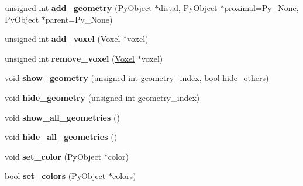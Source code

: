 \begin{DoxyCompactItemize}
\item 
\hypertarget{classCompartment_aab05340ee74143998ff715fcd8ff2f0c}{unsigned int {\bfseries add\-\_\-geometry} (Py\-Object $\ast$distal, Py\-Object $\ast$proximal=Py\-\_\-\-None, Py\-Object $\ast$parent=Py\-\_\-\-None)}\label{classCompartment_aab05340ee74143998ff715fcd8ff2f0c}

\item 
\hypertarget{classCompartment_acf7782fd4a6c881ba22b0496aadbfcb7}{unsigned int {\bfseries add\-\_\-voxel} (\hyperlink{classVoxel}{Voxel} $\ast$voxel)}\label{classCompartment_acf7782fd4a6c881ba22b0496aadbfcb7}

\item 
\hypertarget{classCompartment_aa59eec53596025959d8da75000d55608}{unsigned int {\bfseries remove\-\_\-voxel} (\hyperlink{classVoxel}{Voxel} $\ast$voxel)}\label{classCompartment_aa59eec53596025959d8da75000d55608}

\item 
\hypertarget{classCompartment_ad85eb22510c7f0518d0f0a12ff361ca7}{void {\bfseries show\-\_\-geometry} (unsigned int geometry\-\_\-index, bool hide\-\_\-others)}\label{classCompartment_ad85eb22510c7f0518d0f0a12ff361ca7}

\item 
\hypertarget{classCompartment_a36304c9171a1b6fbf0652379b67fce67}{void {\bfseries hide\-\_\-geometry} (unsigned int geometry\-\_\-index)}\label{classCompartment_a36304c9171a1b6fbf0652379b67fce67}

\item 
\hypertarget{classCompartment_a0ea1d6d34e1e5b5498659ccf51c413d2}{void {\bfseries show\-\_\-all\-\_\-geometries} ()}\label{classCompartment_a0ea1d6d34e1e5b5498659ccf51c413d2}

\item 
\hypertarget{classCompartment_ae5d31347af38773bef049bc995b6900d}{void {\bfseries hide\-\_\-all\-\_\-geometries} ()}\label{classCompartment_ae5d31347af38773bef049bc995b6900d}

\item 
\hypertarget{classCompartment_a88709d6915c189fc6d31de59309648c8}{void {\bfseries set\-\_\-color} (Py\-Object $\ast$color)}\label{classCompartment_a88709d6915c189fc6d31de59309648c8}

\item 
\hypertarget{classCompartment_a6f7c863df4f6975c3d5706b732b99ea4}{bool {\bfseries set\-\_\-colors} (Py\-Object $\ast$colors)}\label{classCompartment_a6f7c863df4f6975c3d5706b732b99ea4}

\end{DoxyCompactItemize}
